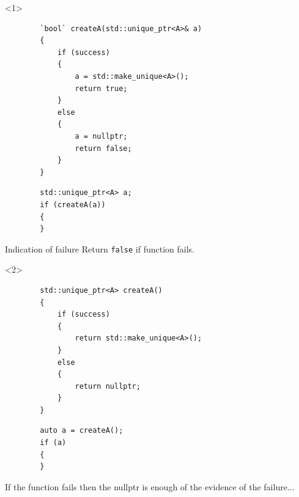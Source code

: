 \documentclass{beamer}
\begin{document}
\begin{frame}[fragile,t]
	\begin{onlyenv}
	\begin{lstlisting}
		`bool` createA(std::unique_ptr<A>& a)
		{
			if (success)
			{
				a = std::make_unique<A>();
				return true;
			}
			else
			{
				a = nullptr;
				return false;
			}
		}
	\end{lstlisting}
    \hrulefill
	\begin{lstlisting}
		std::unique_ptr<A> a;
		if (createA(a))
		{
		}
	\end{lstlisting}
	\begin{block}{Indication of failure}
		Return \texttt{false} if function fails.
	\end{block}
	\end{onlyenv}

	\begin{onlyenv}
	\begin{lstlisting}
		std::unique_ptr<A> createA()
		{
			if (success)
			{
				return std::make_unique<A>();
			}
			else
			{
				return nullptr;
			}
		}
	\end{lstlisting}

    \hrulefill
	\begin{lstlisting}
		auto a = createA();
		if (a)
		{
		}	
	\end{lstlisting}
	\begin{block}{}
		If the function fails then the nullptr is enough of the evidence of the failure...	
	\end{block}
	\end{onlyenv}
\end{frame}
\end{document}
